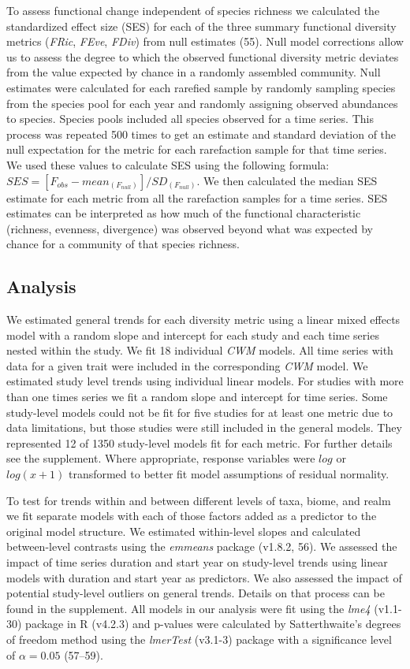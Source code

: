 \documentclass{article}
\begin{document}
To assess functional change independent of species richness we
calculated the standardized effect size (SES) for each of the three
summary functional diversity metrics (\emph{FRic}, \emph{FEve},
\emph{FDiv}) from null estimates (55). Null model corrections allow us
to assess the degree to which the observed functional diversity metric
deviates from the value expected by chance in a randomly assembled
community. Null estimates were calculated for each rarefied sample by
randomly sampling species from the species pool for each year and
randomly assigning observed abundances to species. Species pools
included all species observed for a time series. This process was
repeated 500 times to get an estimate and standard deviation of the null
expectation for the metric for each rarefaction sample for that time
series. We used these values to calculate SES using the following
formula: \(SES = [F_{obs} - mean_{(F_{null})}]/SD_{(F_{null})}\). We
then calculated the median SES estimate for each metric from all the
rarefaction samples for a time series. SES estimates can be interpreted
as how much of the functional characteristic (richness, evenness,
divergence) was observed beyond what was expected by chance for a
community of that species richness.

\hypertarget{analysis}{%
\subsection{Analysis}\label{analysis}}

We estimated general trends for each diversity metric using a linear
mixed effects model with a random slope and intercept for each study and
each time series nested within the study. We fit 18 individual
\emph{CWM} models. All time series with data for a given trait were
included in the corresponding \emph{CWM} model. We estimated study level
trends using individual linear models. For studies with more than one
times series we fit a random slope and intercept for time series. Some
study-level models could not be fit for five studies for at least one
metric due to data limitations, but those studies were still included in
the general models. They represented 12 of 1350 study-level models fit
for each metric. For further details see the supplement. Where
appropriate, response variables were \(log\) or \(log(x+1)\) transformed
to better fit model assumptions of residual normality.

To test for trends within and between different levels of taxa, biome,
and realm we fit separate models with each of those factors added as a
predictor to the original model structure. We estimated within-level
slopes and calculated between-level contrasts using the \emph{emmeans}
package (v1.8.2, 56). We assessed the impact of time series duration and
start year on study-level trends using linear models with duration and
start year as predictors. We also assessed the impact of potential
study-level outliers on general trends. Details on that process can be
found in the supplement. All models in our analysis were fit using the
\emph{lme4} (v1.1-30) package in R (v4.2.3) and p-values were calculated
by Satterthwaite's degrees of freedom method using the \emph{lmerTest}
(v3.1-3) package with a significance level of \(\alpha = 0.05\)
(57--59).
\end{document}
